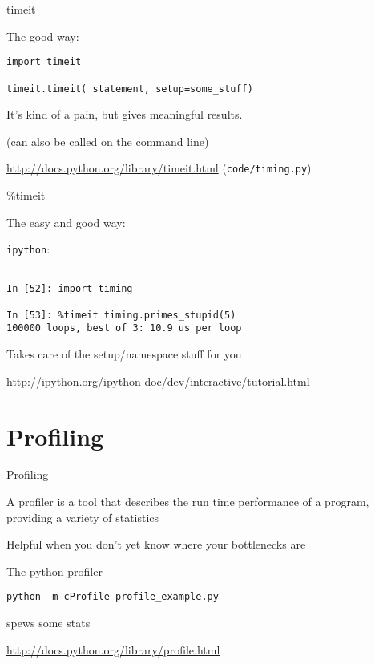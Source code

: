 \documentclass{beamer}
\begin{document}
\begin{frame}[fragile]{timeit}

{\Large The good way:}

\begin{verbatim}
import timeit

timeit.timeit( statement, setup=some_stuff)

\end{verbatim}

{\Large It's kind of a pain, but gives meaningful results.}

(can also be called on the command line)

\vfill
\url{http://docs.python.org/library/timeit.html}
\vfill
(\verb|code/timing.py|)
\end{frame} 

\begin{frame}[fragile]{\%timeit}

{\Large The easy and good way:}

\vfill
{\LARGE \verb|ipython|:}
\begin{verbatim}

In [52]: import timing

In [53]: %timeit timing.primes_stupid(5)
100000 loops, best of 3: 10.9 us per loop

\end{verbatim}

{\Large Takes care of the setup/namespace stuff for you}

\vfill
\url{http://ipython.org/ipython-doc/dev/interactive/tutorial.html}
\end{frame} 

\section{Profiling}

\begin{frame}[fragile]{Profiling}

{\Large A profiler is a tool that describes the run time performance of a
program, providing a variety of statistics}

\vfill
{\Large Helpful when you don't yet know where your bottlenecks are}

\vfill
{\Large The python profiler}

\begin{verbatim}
python -m cProfile profile_example.py  
\end{verbatim}
{\Large spews some stats}


\vfill
\url{http://docs.python.org/library/profile.html}
\end{frame} 
\end{document}
